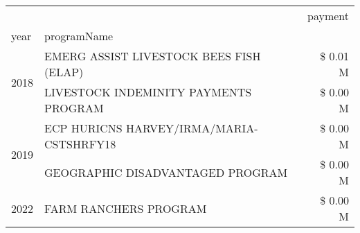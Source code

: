\begin{tabular}{llr}
\toprule
 &  & payment \\
year & programName &  \\
\midrule
\multirow[t]{2}{*}{2018} & EMERG ASSIST LIVESTOCK BEES FISH (ELAP) & \$ 0.01 M \\
 & LIVESTOCK INDEMINITY PAYMENTS PROGRAM & \$ 0.00 M \\
\cline{1-3}
\multirow[t]{2}{*}{2019} & ECP HURICNS HARVEY/IRMA/MARIA-CSTSHRFY18 & \$ 0.00 M \\
 & GEOGRAPHIC DISADVANTAGED PROGRAM & \$ 0.00 M \\
\cline{1-3}
2022 & FARM RANCHERS PROGRAM & \$ 0.00 M \\
\cline{1-3}
\bottomrule
\end{tabular}
